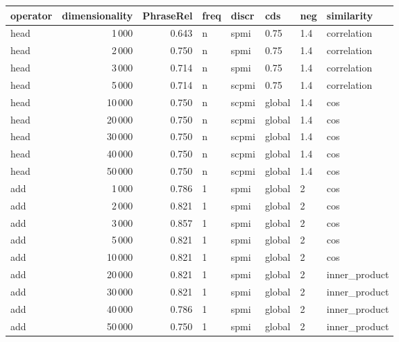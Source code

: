\begin{tabular}{lrrlllll}
\toprule
operator &  dimensionality &  PhraseRel &  freq &  discr &     cds &  neg &     similarity \\
\midrule
    head &            1\,000 &      0.643 &     n &   spmi &    0.75 &  1.4 &    correlation \\
    head &            2\,000 &      0.750 &     n &   spmi &    0.75 &  1.4 &    correlation \\
    head &            3\,000 &      0.714 &     n &   spmi &    0.75 &  1.4 &    correlation \\
    head &            5\,000 &      0.714 &     n &  scpmi &    0.75 &  1.4 &    correlation \\
    head &           10\,000 &      0.750 &     n &  scpmi &  global &  1.4 &            cos \\
    head &           20\,000 &      0.750 &     n &  scpmi &  global &  1.4 &            cos \\
    head &           30\,000 &      0.750 &     n &  scpmi &  global &  1.4 &            cos \\
    head &           40\,000 &      0.750 &     n &  scpmi &  global &  1.4 &            cos \\
    head &           50\,000 &      0.750 &     n &  scpmi &  global &  1.4 &            cos \\
     add &            1\,000 &      0.786 &     1 &   spmi &  global &    2 &            cos \\
     add &            2\,000 &      0.821 &     1 &   spmi &  global &    2 &            cos \\
     add &            3\,000 &      0.857 &     1 &   spmi &  global &    2 &            cos \\
     add &            5\,000 &      0.821 &     1 &   spmi &  global &    2 &            cos \\
     add &           10\,000 &      0.821 &     1 &   spmi &  global &    2 &            cos \\
     add &           20\,000 &      0.821 &     1 &   spmi &  global &    2 &  inner\_product \\
     add &           30\,000 &      0.821 &     1 &   spmi &  global &    2 &  inner\_product \\
     add &           40\,000 &      0.786 &     1 &   spmi &  global &    2 &  inner\_product \\
     add &           50\,000 &      0.750 &     1 &   spmi &  global &    2 &  inner\_product \\

\end{tabular}
